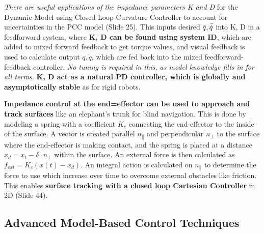 \documentclass[onecolumn,a4paper]{article}
\begin{document}
\emph{There are useful applications of the impedance parameters K and D} for the Dynamic Model using Closed Loop Curvature Controller to account for uncertainties in the PCC model (Slide 25). This inputs desired $\Bar{q}, \Bar{\Dot{q}}$ into K, D  in a feedforward system, where \textbf{K, D can be found using system ID}, which are added to mixed forward feedback to get torque values, and visual feedback is used to calculate output $q, \Dot{q}$, which are fed back into the mixed feedforward-feedback controller. \emph{No tuning is required in this, as model knowledge fills in for all terms.} \textbf{K, D act as a natural PD controller, which is globally and asymptotically stable} as for rigid robots.

\textbf{Impedance control at the end=effector can be used to approach and track surfaces} like an elephant's trunk for blind navigation. This is done by modeling a spring with a coefficient $K_c$ connecting the end-effector to the inside of the surface. A vector is created parallel $n_\parallel$ and perpendicular $n_\perp$ to the surface where the end-effector is making contact, and the spring is placed at a distance $x_d = x_t - \delta \cdot n_\perp$ within the surface. An external force is then calculated as $f_{ext}=K_c(x(t) - x_d)$. An integral action is calculated on $n_\parallel$ to determine the force to use which increase over time to overcome external obstacles like friction. This enables \textbf{surface tracking with a closed loop Cartesian Controller} in 2D (Slide 44).


\subsection{Advanced Model-Based Control Techniques}
\end{document}
